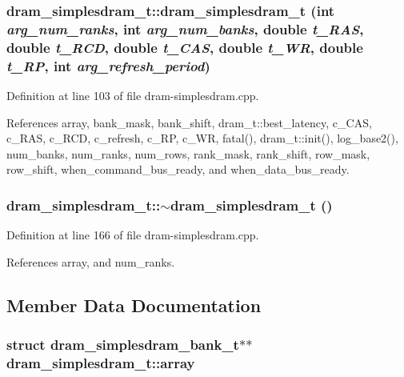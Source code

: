 \subsubsection[{dram\_\-simplesdram\_\-t}]{\setlength{\rightskip}{0pt plus 5cm}dram\_\-simplesdram\_\-t::dram\_\-simplesdram\_\-t (int {\em arg\_\-num\_\-ranks}, \/  int {\em arg\_\-num\_\-banks}, \/  double {\em t\_\-RAS}, \/  double {\em t\_\-RCD}, \/  double {\em t\_\-CAS}, \/  double {\em t\_\-WR}, \/  double {\em t\_\-RP}, \/  int {\em arg\_\-refresh\_\-period})\hspace{0.3cm}{\tt  [inline]}}\label{classdram__simplesdram__t_4779204718761f06ad9c9656f5dd9d22}




Definition at line 103 of file dram-simplesdram.cpp.

References array, bank\_\-mask, bank\_\-shift, dram\_\-t::best\_\-latency, c\_\-CAS, c\_\-RAS, c\_\-RCD, c\_\-refresh, c\_\-RP, c\_\-WR, fatal(), dram\_\-t::init(), log\_\-base2(), num\_\-banks, num\_\-ranks, num\_\-rows, rank\_\-mask, rank\_\-shift, row\_\-mask, row\_\-shift, when\_\-command\_\-bus\_\-ready, and when\_\-data\_\-bus\_\-ready.
\subsubsection[{$\sim$dram\_\-simplesdram\_\-t}]{\setlength{\rightskip}{0pt plus 5cm}dram\_\-simplesdram\_\-t::$\sim$dram\_\-simplesdram\_\-t ()\hspace{0.3cm}{\tt  [inline]}}\label{classdram__simplesdram__t_1adced6527cf895024ddd37e924283b5}




Definition at line 166 of file dram-simplesdram.cpp.

References array, and num\_\-ranks.

\subsection{Member Data Documentation}
\subsubsection[{array}]{\setlength{\rightskip}{0pt plus 5cm}struct {\bf dram\_\-simplesdram\_\-bank\_\-t}$\ast$$\ast$ {\bf dram\_\-simplesdram\_\-t::array}\hspace{0.3cm}{\tt  [read, protected]}}\label{classdram__simplesdram__t_5cd38660f3f475cb0f3dd36611841933}




